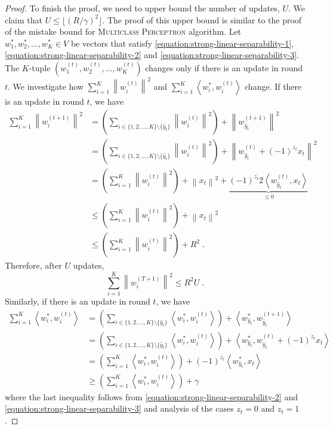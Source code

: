 \documentclass[12pt]{article}
\newcommand{\ip}[2]{\left\langle #1, #2 \right\rangle} %
\newcommand{\norm}[1]{\left\| #1 \right\|}  %
\begin{document}
\begin{proof}
To finish the proof, we need to upper bound the number of updates, $U$. We claim
that $U \le \lfloor (R/\gamma)^2 \rfloor$. The proof of this upper bound is
similar to the proof of the mistake bound for \textsc{Multiclass Perceptron}
algorithm. Let $w_1^*, w_2^*, \dots, w_K^* \in V$ be vectors that satisfy
\eqref{equation:strong-linear-separability-1},
\eqref{equation:strong-linear-separability-2} and
\eqref{equation:strong-linear-separability-3}.
The $K$-tuple $(w_1^{(t)}, w_2^{(t)}, \dots, w_K^{(t)})$
changes only if there is an update in round $t$.
We investigate how $\sum_{i=1}^K \norm{w_i^{(t)}}^2$ and
$\sum_{i=1}^K \ip{w_i^*}{w_i^{(t)}}$ change. If there is an update in round $t$,
we have
\begingroup
\allowdisplaybreaks
\begin{align*}
\sum_{i=1}^K \norm{w_i^{(t+1)}}^2
& = \left( \sum_{i \in \{1,2,\dots,K\} \setminus \{\widehat y_t\}} \norm{w_i^{(t)}}^2 \right) + \norm{w_{\widehat y_t}^{(t+1)}}^2 \\
& = \left( \sum_{i \in \{1,2,\dots,K\} \setminus \{\widehat y_t\}} \norm{w_i^{(t)}}^2 \right) + \norm{w_{\widehat y_t}^{(t)} + (-1)^{z_t} x_t}^2 \\
& = \left( \sum_{i=1}^K \norm{w_i^{(t)}}^2 \right) + \norm{x_t}^2 + \underbrace{(-1)^{z_t} 2 \ip{w_{\widehat y_t}^{(t)}}{x_t}}_{\le 0} \\
& \le \left( \sum_{i=1}^K \norm{w_i^{(t)}}^2 \right) + \norm{x_t}^2 \\
& \le \left( \sum_{i=1}^K \norm{w_i^{(t)}}^2 \right) + R^2 \; .
\end{align*}
\endgroup
Therefore, after $U$ updates,
$$
\sum_{i=1}^K \norm{w_i^{(T+1)}}^2 \le R^2 U \; .
$$
Similarly, if there is an update in round $t$, we have
\begin{align*}
\sum_{i=1}^K \ip{w_i^*}{w_i^{(t)}}
& = \left( \sum_{i \in \{1,2,\dots,K\} \setminus \{\widehat y_t\}} \ip{w_i^*}{w_i^{(t)}} \right) + \ip{w_{\widehat y_t}^*}{w_{\widehat y_t}^{(t+1)}} \\
& = \left( \sum_{i \in \{1,2,\dots,K\} \setminus \{\widehat y_t\}} \ip{w_i^*}{w_i^{(t)}} \right) + \ip{w_{\widehat y_t}^*}{w_{\widehat y_t}^{(t)} + (-1)^{z_t} x_t} \\
& = \left( \sum_{i=1}^K \ip{w_i^*}{w_i^{(t)}} \right) + (-1)^{z_t} \ip{w_{\widehat y_t}^*}{x_t} \\
& \ge \left( \sum_{i=1}^K \ip{w_i^*}{w_i^{(t)}} \right) + \gamma
\end{align*}
where the last inequality follows from \eqref{equation:strong-linear-separability-2}
and \eqref{equation:strong-linear-separability-3} and analysis of the cases $z_t = 0$ and $z_t = 1$.

\end{proof}
\end{document}
